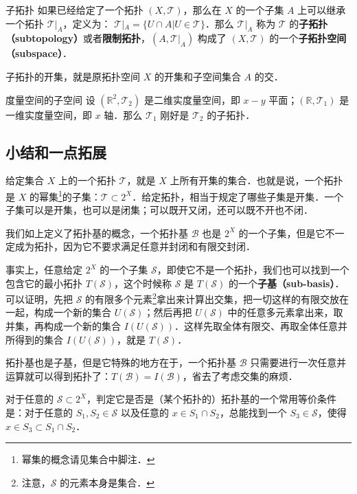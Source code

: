 \begin{definition}{子拓扑}\label{Topol_def3}
如果已经给定了一个拓扑 $(X, \mathcal{T})$，那么在 $X$ 的一个子集 $A$ 上可以继承一个拓扑 $\mathcal{T}|_A$，定义为：
$\mathcal{T}|_A=\{U\cap A|U\in \mathcal{T}\}$．那么 $\mathcal{T}|_A$ 称为 $\mathcal{T}$ 的\textbf{子拓扑（subtopology）}或者\textbf{限制拓扑}，$(A, \mathcal{T}|_A)$ 构成了 $(X, \mathcal{T})$ 的一个\textbf{子拓扑空间（subspace）}．
\end{definition}

子拓扑的开集，就是原拓扑空间 $X$ 的开集和子空间集合 $A$ 的交．

\begin{example}{度量空间的子空间}
设 $(\mathbb{R}^2, \mathcal{T}_2)$ 是二维实度量空间，即 $x-y$ 平面；$(\mathbb{R}, \mathcal{T}_1)$ 是一维实度量空间，即 $x$ 轴．那么 $\mathcal{T}_1$ 刚好是 $\mathcal{T}_2$ 的子拓扑．
\end{example}

\subsection{小结和一点拓展}

给定集合 $X$ 上的一个拓扑 $\mathcal{T}$，就是 $X$ 上所有开集的集合．也就是说，一个拓扑是 $X$ 的幂集\footnote{幂集的概念请见集合中脚注．}的子集：$\mathcal{T}\subset 2^X$．给定拓扑，相当于规定了哪些子集是开集．一个子集可以是开集，也可以是闭集；可以既开又闭，还可以既不开也不闭．

我们如上定义了拓扑基的概念，一个拓扑基 $\mathcal{B}$ 也是 $2^X$ 的一个子集，但是它不一定成为拓扑，因为它不要求满足任意并封闭和有限交封闭．

事实上，任意给定 $2^X$ 的一个子集 $\mathcal{S}$，即使它不是一个拓扑，我们也可以找到一个包含它的最小拓扑 $T(\mathcal{S})$，这个时候称 $\mathcal{S}$ 是 $T(\mathcal{S})$ 的一个\textbf{子基（sub-basis）}．可以证明，先把 $\mathcal{S}$ 的有限多个元素\footnote{注意，$\mathcal{S}$ 的元素本身是集合．}拿出来计算出交集，把一切这样的有限交放在一起，构成一个新的集合 $U(\mathcal{S})$；然后再把 $U(\mathcal{S})$ 中的任意多元素拿出来，取并集，再构成一个新的集合 $I(U(\mathcal{S}))$．这样先取全体有限交、再取全体任意并所得到的集合 $I(U(\mathcal{S}))$，就是 $T(\mathcal{S})$．

拓扑基也是子基，但是它特殊的地方在于，一个拓扑基 $\mathcal{B}$ 只需要进行一次任意并运算就可以得到拓扑了：$T(\mathcal{B})=I(\mathcal{B})$，省去了考虑交集的麻烦．

对于任意的 $\mathcal{S}\subset2^X$，判定它是否是（某个拓扑的）拓扑基的一个常用等价条件是：对于任意的 $S_1, S_2\in \mathcal{S}$ 以及任意的 $x\in S_1\cap S_2$，总能找到一个 $S_3\in\mathcal{S}$，使得 $x\in S_3\subset S_1\cap S_2$．

